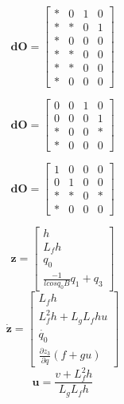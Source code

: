 \documentclass[a4paper]{article}
\begin{document}
\begin{equation}
\mathbf{dO} =
\left[ \begin{array}{cccc}
* & 0 & 1 & 0\\
* & * & 0 & 1\\
* & 0 & 0 & 0\\
* & * & 0 & 0\\    
* & * & 0 & 0\\
* & 0 & 0 & 0
\end{array} \right]
\end{equation}

\begin{equation}
\mathbf{dO} =
\left[ \begin{array}{cccc}
0 & 0 & 1 & 0\\
0 & 0 & 0 & 1\\    
* & 0 & 0 & *\\
* & 0 & 0 & 0
\end{array} \right]
\end{equation}

\begin{equation}
\mathbf{dO} =
\left[ \begin{array}{cccc}
1 & 0 & 0 & 0\\
0 & 1 & 0 & 0\\    
* & * & 0 & *\\
* & 0 & 0 & 0
\end{array} \right]
\end{equation}

\begin{equation}
\mathbf{z} =
\left[ \begin{array}{ccc}
h \\
L_f h \\
q_0 \\
\frac{-1}{l cosq_0 B} q_1 + q_3
\end{array} \right]
\end{equation}
\begin{equation}
\mathbf{\dot{z}} =
\left[ \begin{array}{ccc}
L_f h\\
L_f^2 h + L_g L_f h u \\
\dot{q_0} \\
\frac{\partial z_3}{\partial q} (f + gu)
\end{array} \right]
\end{equation}
\begin{equation}
\mathbf{u} =
\frac{v + L_f^2 h}{L_g L_f h}
\end{equation}
\end{document}
